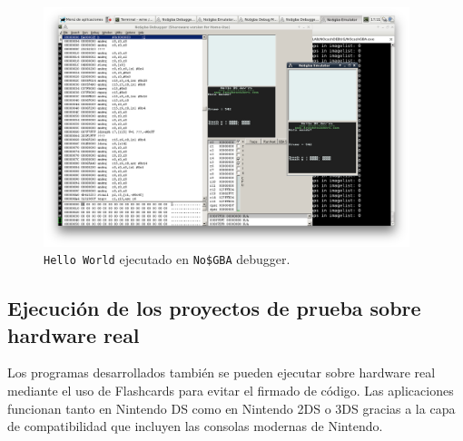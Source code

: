 \documentclass[12pt,english]{article}
\begin{document}
\begin{figure}[h!]
	\caption{{\tt Hello World} ejecutado en {\tt No\$GBA} debugger.}
	\label{fig:dependency}
	\centering
	\includegraphics[width=0.95\textwidth]{P1Media/NoCashDebug}
\end{figure}
	
	\subsection{Ejecución de los proyectos de prueba sobre hardware real}
	
	Los programas desarrollados también se pueden ejecutar sobre hardware real mediante el uso de Flashcards para evitar el firmado de código. Las aplicaciones funcionan tanto en Nintendo DS como en Nintendo 2DS o 3DS gracias a la capa de compatibilidad que incluyen las consolas modernas de Nintendo.
	
\end{document}
